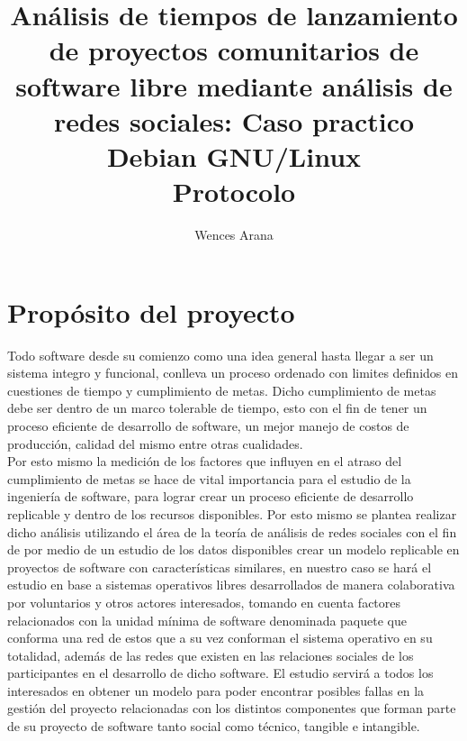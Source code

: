 \documentclass[12pt]{report}
\begin{document}
  
\title{  
	{Análisis  de  tiempos  de  lanzamiento  de
	proyectos comunitarios  de software  libre mediante 
	análisis  de redes sociales:   Caso   practico    
	Debian   GNU/Linux}
	\\   {Protocolo}   
}
\author{Wences Arana}
\maketitle

\tableofcontents
\chapter*{Propósito del proyecto}

Todo software desde  su comienzo 
como una idea general  hasta llegar a
ser un sistema  integro y funcional, conlleva un  proceso ordenado con
limites definidos  en cuestiones  de tiempo  y cumplimiento  de metas.
Dicho cumplimiento de  metas debe ser dentro de un  marco tolerable de
tiempo, esto con el fin de tener un proceso eficiente de desarrollo de
software, un mejor  manejo de costos de producción,  calidad del mismo
entre otras cualidades.
\\
Por esto mismo la medición de los factores que
influyen  en el  atraso del  cumplimiento de  metas se  hace de  vital
importancia para el estudio de  la ingeniería de software, para lograr
crear un  proceso eficiente de  desarrollo replicable y dentro  de los
recursos  disponibles.   Por  esto  mismo  
se  plantea  realizar  dicho
análisis utilizando el área de la teoría de análisis de redes sociales
con el fin de  por medio de un estudio de  los datos disponibles crear
un  modelo replicable  en  proyectos de  software con  características
similares,  en nuestro  caso se  hará el  estudio en  base a  sistemas
operativos libres desarrollados de manera colaborativa por voluntarios
y otros  actores interesados, tomando en  cuenta factores relacionados
con la unidad  mínima de software denominada paquete  que conforma una
red  de estos  que  a su  vez  conforman el  sistema  operativo en  su
totalidad, además de las redes  que existen en las relaciones sociales
de los participantes  en el desarrollo de dicho  software.  El estudio
servirá  a todos  los  interesados  en obtener  un  modelo para  poder
encontrar posibles fallas en la  gestión del proyecto relacionadas con
los distintos componentes que forman  parte de su proyecto de software
tanto social como técnico, tangible e intangible.
\end{document}
